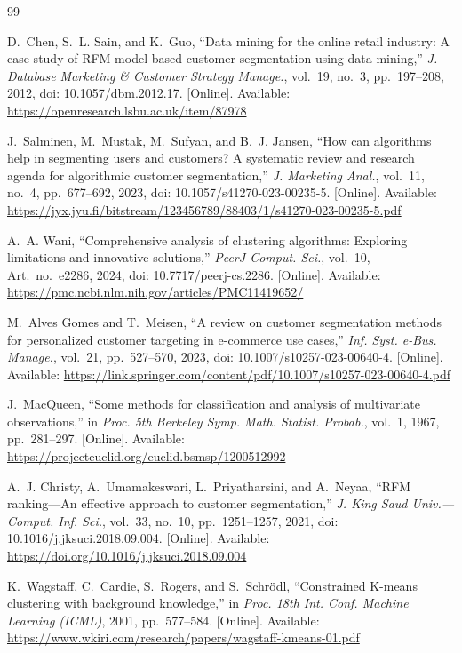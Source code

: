 \documentclass[conference,10pt]{IEEEtran}
\begin{document}
\begin{thebibliography}{99}

D.~Chen, S.~L. Sain, and K.~Guo, ``Data mining for the online retail
industry: A case study of RFM model-based customer segmentation using data
mining,'' \emph{J. Database Marketing \& Customer Strategy Manage.}, vol.~19,
no.~3, pp.~197--208, 2012, doi: 10.1057/dbm.2012.17. [Online]. Available:
\url{https://openresearch.lsbu.ac.uk/item/87978}

J.~Salminen, M.~Mustak, M.~Sufyan, and B.~J. Jansen, ``How can algorithms
help in segmenting users and customers? A systematic review and research
agenda for algorithmic customer segmentation,'' \emph{J. Marketing Anal.},
vol.~11, no.~4, pp.~677--692, 2023, doi: 10.1057/s41270-023-00235-5.
[Online]. Available:
\url{https://jyx.jyu.fi/bitstream/123456789/88403/1/s41270-023-00235-5.pdf}

A.~A. Wani, ``Comprehensive analysis of clustering algorithms: Exploring
limitations and innovative solutions,'' \emph{PeerJ Comput. Sci.}, vol.~10,
Art.~no.~e2286, 2024, doi: 10.7717/peerj-cs.2286. [Online]. Available:
\url{https://pmc.ncbi.nlm.nih.gov/articles/PMC11419652/}

M.~Alves Gomes and T.~Meisen, ``A review on customer segmentation methods for
personalized customer targeting in e-commerce use cases,'' \emph{Inf. Syst.
e-Bus. Manage.}, vol.~21, pp.~527--570, 2023,
doi: 10.1007/s10257-023-00640-4. [Online]. Available:
\url{https://link.springer.com/content/pdf/10.1007/s10257-023-00640-4.pdf}

J.~MacQueen, ``Some methods for classification and analysis of multivariate
observations,'' in \emph{Proc. 5th Berkeley Symp. Math. Statist. Probab.},
vol.~1, 1967, pp.~281--297. [Online]. Available:
\url{https://projecteuclid.org/euclid.bsmsp/1200512992}

A.~J. Christy, A.~Umamakeswari, L.~Priyatharsini, and A.~Neyaa, ``RFM
ranking---An effective approach to customer segmentation,'' \emph{J. King
Saud Univ.---Comput. Inf. Sci.}, vol.~33, no.~10, pp.~1251--1257, 2021,
doi: 10.1016/j.jksuci.2018.09.004. [Online]. Available:
\url{https://doi.org/10.1016/j.jksuci.2018.09.004}

K.~Wagstaff, C.~Cardie, S.~Rogers, and S.~Schr\"{o}dl, ``Constrained K-means
clustering with background knowledge,'' in \emph{Proc. 18th Int. Conf.
Machine Learning (ICML)}, 2001, pp.~577--584. [Online]. Available:
\url{https://www.wkiri.com/research/papers/wagstaff-kmeans-01.pdf}


\end{thebibliography}
\end{document}
